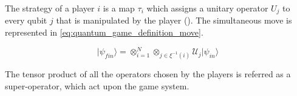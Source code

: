 The strategy of a player $i$ is a map $\tau_{i}$ which assigns a
unitary operator $U_{j}$ to every qubit $j$ that is manipulated
by the player ().
The simultaneous move is represented in \eqref{eq:quantum_game_definition_move}.

\begin{equation}
\vert\psi_{fin}\rangle=\otimes_{i=1}^{N}\otimes_{j\in\xi^{-1}(i)}\mathcal{U}_{j}\vert\psi_{in}\rangle
\label{eq:quantum_game_definition_move}
\end{equation}

The tensor product of all the operators chosen by the players is referred as a super-operator, which act upon the game system.

\begin{comment}
In the article "Quantum Games and Quantum Strategies"\cite{Eisert2008}, the authors describe a quantization scheme for the Prisoner's Dilemma game. The way the initial state, $\vert\psi_{in}\rangle$, is set-up in the game system provide a way to entangle the game system, thus allowing the study of this phenomenon. For a $2$-player game, this is accomplished using Equation \eqref{eq:2_4:estado_inicial_prisioneiro}. $\mathcal{J}$ is a matrix exponential that is chosen because it can commute with a super-operator, made from the subset of unitary operators that contains the identity matrix and the Bit-flip Pauli matrix\cite{citeulike:10961388}. According to \cite{Eisert2008}, the parameter $\gamma$ becomes a way to measure the entanglement in the system.

\begin{equation}
\label{eq:2_4:matrix_exponencial_esoterica}
\mathcal{J}=exp\left\{ i\frac{\gamma}{2}\left[\begin{array}{cc}
0 & 1\\
1 & 0
\end{array}\right]\otimes\left[\begin{array}{cc}
0 & 1\\
1 & 0
\end{array}\right]\right\}
\end{equation} 

\begin{equation}
\label{eq:2_4:estado_inicial_prisioneiro}
\begin{split}
\vert\psi_{in}(\gamma)\rangle=exp\left\{ i\frac{\gamma}{2}\left[\begin{array}{cc}
0 & 1\\
1 & 0
\end{array}\right]\otimes\left[\begin{array}{cc}
0 & 1\\
1 & 0
\end{array}\right]\right\} \vert00\rangle \\
=cos(\frac{\gamma}{2})\vert00\rangle+isin(\frac{\gamma}{2})\vert11\rangle,\gamma\in(0,\pi)
\end{split}
\end{equation}

\end{comment}


